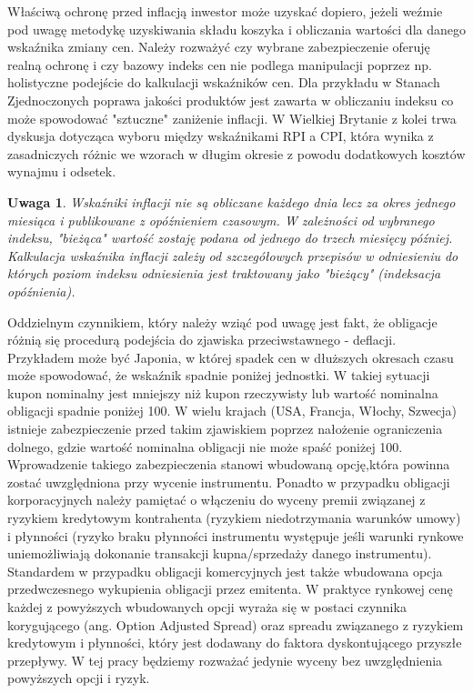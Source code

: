 \documentclass{mini}
\theoremstyle{mythstyle}
\newtheorem{Uwaga}{Uwaga}[chapter]
\begin{document}
	Właściwą ochronę przed inflacją inwestor może uzyskać dopiero, jeżeli weźmie pod uwagę metodykę uzyskiwania składu koszyka i obliczania wartości dla danego wskaźnika zmiany cen. Należy rozważyć czy wybrane zabezpieczenie oferuję realną ochronę i czy bazowy indeks cen nie podlega manipulacji poprzez np. holistyczne podejście do kalkulacji wskaźników cen. Dla przykładu w Stanach Zjednoczonych poprawa jakości produktów jest zawarta w obliczaniu indeksu co może spowodować "sztuczne" zaniżenie inflacji. W Wielkiej Brytanie z kolei trwa dyskusja dotycząca wyboru między wskaźnikami RPI a CPI, która wynika z zasadniczych różnic we wzorach w długim okresie z powodu dodatkowych kosztów wynajmu i odsetek. \\ 
	\begin{Uwaga}
		Wskaźniki inflacji nie są obliczane każdego dnia lecz za okres jednego miesiąca i publikowane z opóźnieniem czasowym. W zależności od wybranego indeksu, "bieżąca" wartość zostaję podana od jednego do trzech miesięcy później. Kalkulacja wskaźnika inflacji zależy od szczegółowych przepisów w odniesieniu do których poziom indeksu odniesienia jest traktowany jako "bieżący" (indeksacja opóźnienia).
	\end{Uwaga}

	Oddzielnym czynnikiem, który należy wziąć pod uwagę jest fakt, że obligacje różnią się procedurą podejścia do zjawiska przeciwstawnego - deflacji. Przykładem może być Japonia, w której spadek cen w dłuższych okresach czasu może spowodować, że wskaźnik spadnie poniżej jednostki. W takiej sytuacji kupon nominalny jest mniejszy niż kupon rzeczywisty lub wartość nominalna obligacji spadnie poniżej 100. W wielu krajach (USA, Francja, Włochy, Szwecja) istnieje zabezpieczenie przed takim zjawiskiem poprzez nałożenie ograniczenia dolnego, gdzie wartość nominalna obligacji nie może spaść poniżej 100. Wprowadzenie takiego zabezpieczenia stanowi wbudowaną opcję,która powinna zostać uwzględniona przy wycenie instrumentu. Ponadto w przypadku obligacji korporacyjnych należy pamiętać o włączeniu do wyceny premii związanej z ryzykiem kredytowym kontrahenta (ryzykiem niedotrzymania warunków umowy) i płynności (ryzyko braku płynności instrumentu występuje jeśli warunki rynkowe uniemożliwiają dokonanie transakcji kupna/sprzedaży danego instrumentu). Standardem w przypadku obligacji komercyjnych jest także wbudowana opcja przedwczesnego wykupienia obligacji przez emitenta. W praktyce rynkowej cenę każdej z powyższych wbudowanych opcji wyraża się w postaci czynnika korygującego (ang. Option Adjusted Spread) oraz  spreadu związanego z ryzykiem kredytowym i płynności, który jest dodawany do faktora dyskontującego przyszłe przepływy. W tej pracy będziemy rozważać jedynie wyceny bez uwzględnienia powyższych opcji i ryzyk.
			
\end{document}
